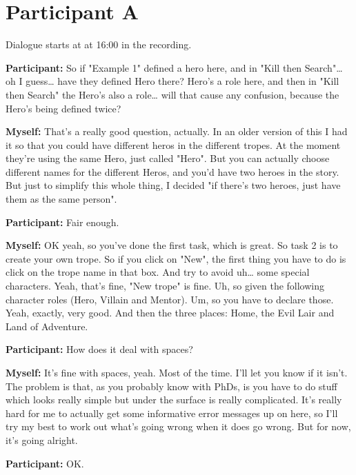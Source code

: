 \documentclass[11pt]{report}
\newcommand{\llabel}[1]{\hypertarget{llineno:#1}{\linelabel{#1}}}
\begin{document}
\section{Participant A}
Dialogue starts at at 16:00 in the recording.


\begin{linenumbers}
\textbf{Participant:} So if "Example 1" defined a hero here, and in "Kill then
Search"\ldots{} oh I guess\ldots{} have they defined Hero there? Hero's a role
here, and then in "Kill then Search" the Hero's also a role\ldots{} will that
cause any confusion, because the Hero's being defined twice?\llabel{lne:feature1a}

\textbf{Myself:} That's a really good question, actually. In an older version of this I had it so that you could have different heros in the different tropes. At the moment they're using the same Hero, just called "Hero". But you can actually choose different names for the different Heros, and you'd have two heroes in the story. But just to simplify this whole thing, I decided "if there's two heroes, just have them as the same person".

\textbf{Participant:} Fair enough.

\textbf{Myself:} OK yeah, so you've done the first task, which is great. So task 2 is to create your own trope. So if you click on "New", the first thing you have to do is click on the trope name in that box. And try to avoid uh\ldots{} some special characters. Yeah, that's fine, "New trope" is fine. Uh, so given the following character roles (Hero, Villain and Mentor). Um, so you have to declare those. Yeah, exactly, very good. And then the three places: Home, the Evil Lair and Land of Adventure.

\textbf{Participant:} How does it deal with spaces?\llabel{lne:syntax1a}

\textbf{Myself:} It's fine with spaces, yeah. Most of the time. I'll let you know if it isn't. The problem is that, as you probably know with PhDs, is you have to do stuff which looks really simple but under the surface is really complicated. It's really hard for me to actually get some informative error messages up on here, so I'll try my best to work out what's going wrong when it does go wrong. But for now, it's going alright.

\textbf{Participant:} OK.


\end{linenumbers}
\end{document}
